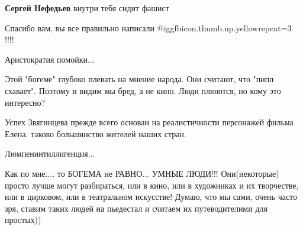 \begin{itemize}
\begin{itemize}
\textbf{Сергей Нефедьев} внутри тебя сидит фашист

\end{itemize} %

Спасибо вам, вы все правильно написали @igg{fbicon.thumb.up.yellow}{repeat=3} !!!!

Аристократия помойки...


Этой "богеме" глубоко плевать на мнение народа. Они считают, что "пипл
схавает". Поэтому и видим мы бред, а не кино. Люди плюются, но кому это
интересно?

Успех Звягинцева прежде всего основан на реалистичности персонажей фильма Елена: таково большинство жителей наших стран.

Люмпенинтиллигенция...


Как по мне.... то БОГЕМА не РАВНО... УМНЫЕ ЛЮДИ!!! Они(некоторые) просто лучше
могут разбираться, или в кино, или в художниках и их творчестве, или в
цирковом, или в театральном искусстве! Думаю, что мы сами, очень часто зря,
ставим таких людей на пьедестал и считаем их путеводителими для простых))

\end{itemize} %
